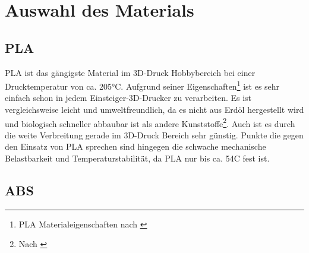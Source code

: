 \chapter{Auswahl des Materials}

\section{PLA}
\ac{PLA} ist das gängigste Material im 3D-Druck Hobbybereich bei einer Drucktemperatur von ca. 205°C. Aufgrund seiner Eigenschaften\footnote{PLA Materialeigenschaften nach \cite{ulPLA}} ist es sehr einfach schon in jedem Einsteiger-3D-Drucker zu verarbeiten. Es ist vergleichsweise leicht und umweltfreundlich, da es nicht aus Erdöl hergestellt wird und biologisch schneller abbaubar ist als andere Kunststoffe\footnote{Nach \cite{10093722}}. Auch ist es durch die weite Verbreitung gerade im 3D-Druck Bereich sehr günstig.
Punkte die gegen den Einsatz von \ac{PLA} sprechen sind hingegen die schwache mechanische Belastbarkeit und Temperaturstabilität, da \ac{PLA} nur bis ca. 54\degree C fest ist.

\section{ABS}